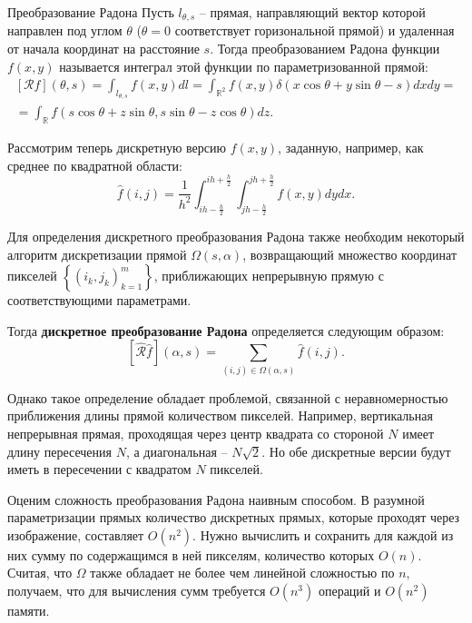 
\begin{definition}{Преобразование Радона}
    Пусть $l_{\theta, s}$ -- прямая, направляющий вектор которой направлен под углом $\theta$ ($\theta = 0$ соответствует горизональной прямой) и удаленная от начала координат на расстояние $s$. Тогда преобразованием Радона функции $f(x, y)$ называется интеграл этой функции по параметризованной прямой:
    \begin{gather*}
        \left[ \mathcal{R}f \right](\theta, s) =
        \int_{l_{\theta, s}} f(x, y) dl =
        \int_{\mathbb{R}^2} f(x, y) \delta(x \cos \theta + y \sin \theta - s) dx dy =\\=
        \int_{\mathbb{R}} f(s\cos\theta + z\sin\theta, s\sin\theta - z\cos\theta) dz.
    \end{gather*}
\end{definition}

Рассмотрим теперь дискретную версию $f(x, y)$, заданную, например, как среднее по квадратной области:
\begin{equation*}
    \hat{f}(i, j) =
    \frac{1}{h^2} \int_{ih - \frac{h}{2}}^{ih + \frac{h}{2}} \int_{jh - \frac{h}{2}}^{jh + \frac{h}{2}} f(x, y) dy dx.
\end{equation*}

Для определения дискретного преобразования Радона также необходим некоторый алгоритм дискретизации прямой $\Omega\left( s, \alpha \right)$, возвращающий множество координат пикселей $\left\{ \left( i_k, j_k \right)_{k=1}^{m} \right\}$, приближающих непрерывную прямую с соответствующими параметрами.

Тогда \textbf{дискретное преобразование Радона} определяется следующим образом:
\begin{equation*}
    \left[ \hat{\mathcal{R}} \hat{f} \right](\alpha, s) = \sum_{(i,j) \in \Omega(\alpha, s)} \hat{f}\left( i, j \right).
\end{equation*}

Однако такое определение обладает проблемой, связанной с неравномерностью приближения длины прямой количеством пикселей. Например, вертикальная непрерывная прямая, проходящая через центр квадрата со стороной $N$ имеет длину пересечения $N$, а диагональная -- $N\sqrt{2}$. Но обе дискретные версии будут иметь в пересечении с квадратом $N$ пикселей.


Оценим сложность преобразования Радона наивным способом. В разумной параметризации прямых количество дискретных прямых, которые проходят через изображение, составляет $O(n^2)$. Нужно вычислить и сохранить для каждой из них сумму по содержащимся в ней пикселям, количество которых $O(n)$. Считая, что $\Omega$ также обладает не более чем линейной сложностью по $n$, получаем, что для вычисления сумм требуется $O(n^3)$ операций и $O(n^2)$ памяти.

